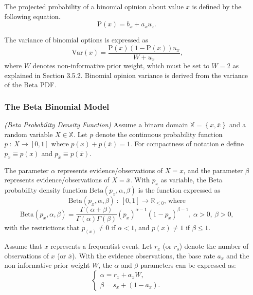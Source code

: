 The projected probability of a binomial opinion about value $x$ is defined by the following equation.
\begin{equation}
	\mathrm{P}(x) = b_x + a_x u_x\text{.}
\end{equation}

The variance of binomial options is expressed as
\begin{equation}
	\mathrm{Var}(x) = \dfrac{\mathrm{P}(x)(1 - \mathrm{P}(x))u_x}{W + u_x}\text{,}
\end{equation}
where $W$ denotes non-informative prior weight, which must be set to $W = 2$ as explained in Section 3.5.2. Binomial opinion variance is derived from the variance of the Beta PDF.

\subsubsection{The Beta Binomial Model}

\begin{definition}
	\emph{(Beta Probability Density Function)} Assume a binaru domain $\mathbb{X} = \left\{x,\overline{x}\right\}$ and a random variable $X \in \mathbb{X}$. Let $p$ denote the continuous probability function $p\ :\ X \rightarrow \left[0,1\right]$ where $p(x) + p(\overline{x}) = 1$. For compactness of notation e define $p_x \equiv p\left(x\right)$ and $p_{\overline{x}} \equiv p\left(\overline{x}\right)$.

	The parameter $\alpha$ represents evidence/observations of $X = x$, and the parameter $\beta$ represents evidence/observations of $X = \overline{x}$. With $p_x$ as variable, the Beta probability density function $\mathrm{Beta}(p_x, \alpha, \beta)$ is the function expressed as
	\begin{equation}
		\mathrm{Beta}(p_x, \alpha, \beta)\ :\ [0, 1] \rightarrow \mathbb{R}_{\leq0}\text{, where}
	\end{equation}
	\begin{equation}
		\mathrm{Beta}(p_x, \alpha, \beta) = \dfrac{\Gamma(\alpha + \beta)}{\Gamma(\alpha)\Gamma(\beta)}(p_x)^{\alpha - 1}(1 - p_x)^{\beta - 1},\ \alpha > 0,\ \beta > 0,
	\end{equation}
	with the restrictions that $p_(x) \neq 0$ if $\alpha < 1$, and $p(x) \neq 1$ if $\beta \leq 1$.
\end{definition}

Assume that $x$ represents a frequentist event. Let $r_x$ (or $r_s$) denote the number of observations of $x$ (or $\overline{x}$). With the evidence observations, the base rate $a_x$ and the non-informative prior weight $W$, the $\alpha$ and $\beta$ parameters can be expressed as:
\begin{equation}
	\begin{cases}
		\alpha = r_x + a_x W\text{,} \\
		\beta = s_x + (1 - a_x)\text{.}
	\end{cases}
\end{equation}

